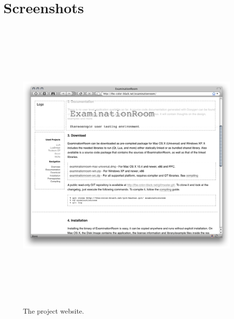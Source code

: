 \section{Screenshots}

\begin{figure}
\begin{center}
\includegraphics[height=15cm]{screenshots/project_screenshot.png}
\caption{The project website.\label{ssProject}}
\end{center}
\end{figure}

